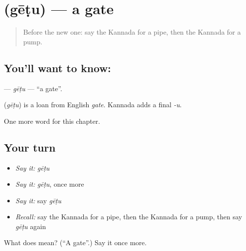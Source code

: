 \section[\texorpdfstring{\kn{ಗೇಟು} (gēṭu)}{ಗೇಟು (gēṭu)}]{ (gēṭu) — a gate}

\label{lesson:KA-C267-getu}



\begin{quote}
Before the new one: say the Kannada for a pipe, then the Kannada for a pump.
\end{quote}

\subsection*{You'll want to know: }
\textbf{} — \emph{gēṭu} — \textquotedblleft{}a gate\textquotedblright{}.

\begin{cousinweb}
\textbf{} (\emph{gēṭu}) is a loan from English \emph{gate}. Kannada adds a final \emph{-u}.
\end{cousinweb}

\begin{grammarlens}[title={What you've built}]
One more word for this chapter.
\end{grammarlens}

\subsection*{Your turn}
\begin{itemize}
\raggedright
  \item \emph{Say it:} \emph{gēṭu}
  \item \emph{Say it:} \emph{gēṭu}, once more
  \item \emph{Say it:} say \emph{gēṭu}
  \item \emph{Recall:} say the Kannada for a pipe, then the Kannada for a pump, then say \emph{gēṭu} again
\end{itemize}

\begin{tcolorbox}[breakable,colback=teal!4,colframe=teal!35!black,title={Before you move on}]
What does  mean? (\textquotedblleft{}A gate\textquotedblright{}.) Say it once more.
\end{tcolorbox}
